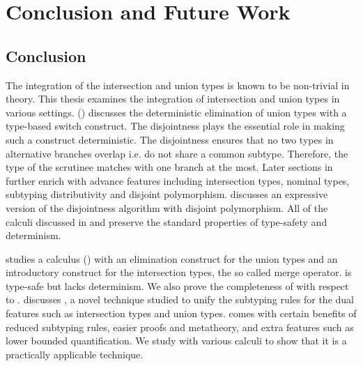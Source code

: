 
\chapter{Conclusion and Future Work}
\label{chap:future}


\section{Conclusion}

The integration of the intersection and union
types is known to be non-trivial in theory.
This thesis examines the integration of
intersection and union types in
various settings.  (\name)
discusses the deterministic elimination of
union types with a type-based switch construct.
The disjointness plays the essential role
in making such a construct deterministic.
The disjointness ensures that no two
types in alternative branches overlap i.e.
do not share a common subtype. Therefore,
the type of the scrutinee matches with one branch
at the most. Later sections in 
further enrich \name with advance features
including intersection types, nominal types,
subtyping distributivity and disjoint polymorphism.
 discusses an
expressive version of the disjointness algorithm
with disjoint polymorphism.
All of the calculi discussed in 
and  preserve the
standard properties of type-safety and determinism.

 studies a calculus (\namems) with
an elimination construct for the union types
and an introductory construct for the intersection types,
the so called merge operator.
\namems is type-safe but lacks
determinism. We also prove the completeness of \namems
with respect to \cite{dunfield2014elaborating}.
 discusses \nameduo,
a novel technique studied to unify the subtyping rules
for the dual features such as intersection
types and union types. \nameduo comes with
certain benefits of reduced subtyping rules,
easier proofs and metatheory,
and extra features such as lower bounded
quantification. We study \nameduo with various
calculi to show that it is a practically
applicable technique.

